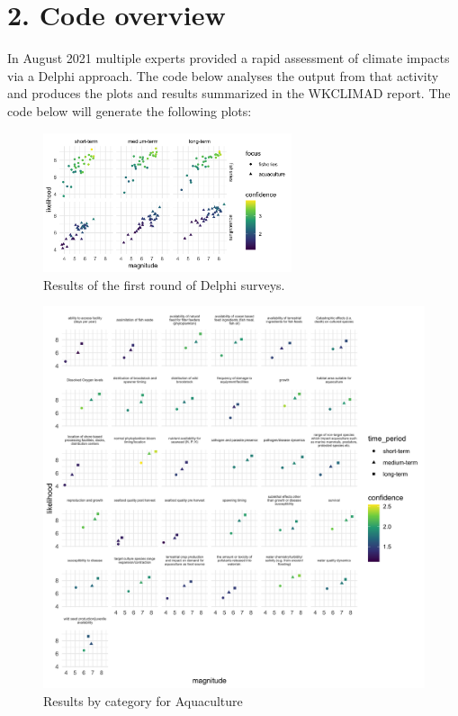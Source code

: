 \documentclass[
]{article}
\begin{document}
\hypertarget{code-overview}{%
\section{2. Code overview}\label{code-overview}}

In August 2021 multiple experts provided a rapid assessment of climate
impacts via a Delphi approach. The code below analyses the output from
that activity and produces the plots and results summarized in the
WKCLIMAD report. The code below will generate the following plots:

\begin{figure}
\centering
\includegraphics[width=0.65\textwidth,height=\textheight]{Figs/Fig1_all_byTimeFrame.png}
\caption{Results of the first round of Delphi surveys.}
\end{figure}

\begin{figure}
\centering
\includegraphics[width=1\textwidth,height=\textheight]{Figs/plot_all_aqua.png}
\caption{Results by category for Aquaculture}
\end{figure}
\end{document}
